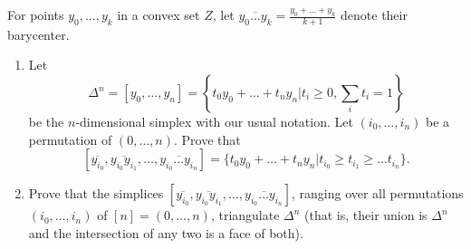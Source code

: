 \begin{problem}
  For points $y_0, \ldots, y_k$ in a convex set $Z$, let $\overline{y_0 \ldots y_k} = \frac{y_0 + \ldots + y_k}{k+1}$ denote their barycenter.
\begin{enumerate}[font=\scshape,label=\textbf{(\Alph*)}]
  \item Let
  \[
\Delta^n = [y_0, \ldots, y_n] = \left\{t_0 y_0 + \ldots + t_n y_n | t_i \geq 0, \sum_i t_i = 1\right\}
  \]
  be the $n$-dimensional simplex with our usual notation. Let $(i_0, \ldots, i_n)$ be a permutation of $(0, \ldots, n)$. Prove that
  \[
[\overline{y_{i_0}}, \overline{y_{i_0}y_{i_1}}, \ldots , \overline{y_{i_0}\ldots y_{i_n}}] =\{t_0 y_0 + \ldots + t_n y_n | t_{i_0} \geq t_{i_1} \geq \ldots t_{i_n} \}.
  \]

  \item Prove that the simplices $[\overline{y_{i_0}}, \overline{y_{i_0}y_{i_1}}, \ldots , \overline{y_{i_0}\ldots y_{i_n}}]$, ranging over all permutations $(i_0, \ldots, i_n)$ of $[n] = (0, \ldots, n)$, triangulate $\Delta^n$ (that is, their union is $\Delta^n$ and the intersection of any two is a face of both).
\end{enumerate}

\end{problem}
